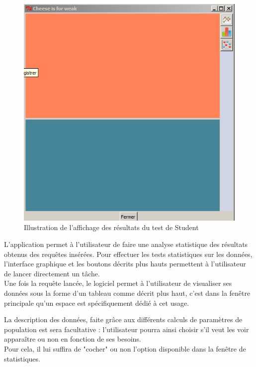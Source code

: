 \documentclass[a4paper,10pt]{report}
\begin{document}
\begin{figure}[H]

\centering
\includegraphics[scale=0.6]{test.jpg}
\caption{Illustration de l'affichage des résultats du test de Student}

\end{figure} 

L'application permet à l'utilisateur de faire une analyse  statistique des résultats obtenus des requêtes insérées. Pour effectuer les tests statistiques sur les données, l'interface graphique et les boutons décrits plus hauts permettent à l'utilisateur de lancer directement un tâche. \\

Une fois la requête lancée, le logiciel permet à l'utilisateur de visualiser ses données sous la forme d'un tableau comme décrit plus haut, c'est dans la fenêtre principale qu'un espace est spécifiquement dédié à cet usage.

La description des données, faite grâce aux différents calculs de paramètres de population est sera facultative : l'utilisateur pourra ainsi choisir s'il veut les voir apparaître ou non en fonction de ses besoins. \\
Pour cela, il lui suffira de "cocher" ou non l'option disponible dans la fenêtre de statistiques.\\
\end{document}
